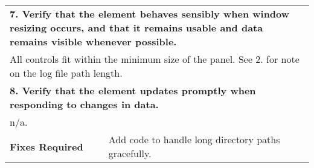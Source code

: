 \begin{longtable}{ l p{10cm} }
 \hline
 \multicolumn{2}{p{14cm}}{\textbf{7. Verify that the element behaves sensibly when window resizing occurs, and that it remains usable and data remains visible whenever possible.}}\\
 \multicolumn{2}{p{14cm}}{All controls fit within the minimum size of the panel. See 2. for note on the log file path length.}\\
 \hline
 \multicolumn{2}{p{14cm}}{\textbf{8. Verify that the element updates promptly when responding to changes in data.}}\\
 \multicolumn{2}{p{14cm}}{n/a.}\\
 \hline
 \textbf{Fixes Required} & Add code to handle long directory paths gracefully.\\
 \bottomrule
\end{longtable}
\clearpage

